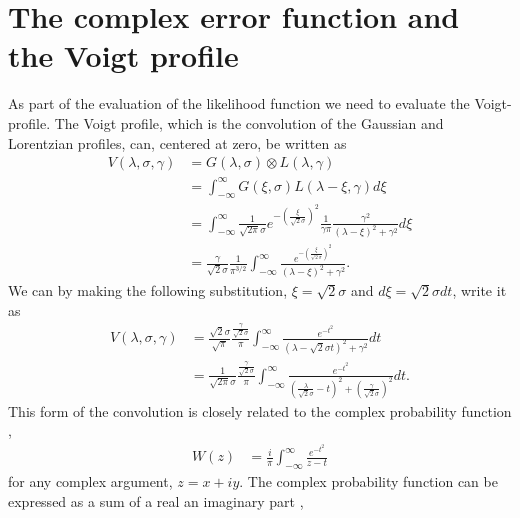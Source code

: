 \documentclass[a4paper,fleqn,usenatbib]{mnras}
\begin{document}
\section{The complex error function and the Voigt profile}
As part of the evaluation of the likelihood function we need to evaluate the Voigt-profile. The Voigt profile, which is the convolution of the Gaussian and Lorentzian profiles, can, centered at zero, be written as \citep{pagnini2010} 
\begin{equation} 
	\begin{split}
		V(\lambda,\sigma, \gamma)  
		& = G(\lambda, \sigma)  \otimes L(\lambda, \gamma) \\
		& = \int_{-\infty}^{\infty} G(\xi, \sigma) L(\lambda - \xi, \gamma) d\xi \\
		& = \int_{-\infty}^{\infty} \frac{1}{\sqrt{2 \pi} \sigma} e^{- \left( \frac{\xi}{\sqrt{2} \sigma}  \right)^2 } \frac{1}{\gamma \pi} \frac{\gamma^2}{(\lambda - \xi)^2 + \gamma^2} d\xi \\
		& = \frac{\gamma}{\sqrt{2} \sigma} \frac{1}{ \pi^{3/2}}   \int_{-\infty}^{\infty} \frac{e^{- \left( \frac{\xi}{\sqrt{2} \sigma}  \right)^2 }}{(\lambda - \xi)^2 + \gamma^2}.
	\end{split}
\end{equation}
We can by making the following substitution, $\xi = \sqrt{2} \sigma$ and $d\xi = \sqrt{2} \sigma dt$, write it as
\begin{equation} 
	\begin{split}
		V(\lambda,\sigma, \gamma)  
		& =  \frac{\sqrt{2} \sigma}{ \sqrt{{\pi}}} \frac{\frac{\gamma}{\sqrt{2} \sigma}}{\pi}  \int_{-\infty}^{\infty} \frac{e^{- t^2 }}{(\lambda - \sqrt{2} \sigma t)^2 + \gamma^2} dt \\
		& = \frac{1}{\sqrt{2 \pi} \sigma}  \frac{\frac{\gamma}{\sqrt{2} \sigma}}{\pi}  \int_{-\infty}^{\infty} \frac{e^{- t^2 }}{\left(\frac{\lambda}{\sqrt{2} \sigma} -  t\right)^2 + \left(\frac{\gamma}{\sqrt{2} \sigma}\right)^2} dt.	
	\end{split}
\end{equation}
This form of the convolution is closely related to the complex probability function \citep{letchworth2007, abrarov2015a},
\begin{equation} 
	\begin{split}
		W(z)  
		& = \frac{i}{\pi} \int_{-\infty}^{\infty} \frac{e^{-t^2}}{z - t}  
	\end{split}
\end{equation}
for any complex argument, $z = x + iy$. The complex probability function can be expressed as a sum of a real an imaginary part \citep{benner1995, abrarov2015b},
\end{document}
